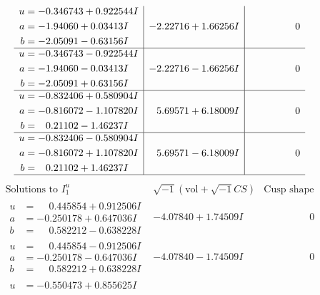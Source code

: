\documentclass[1p]{elsarticle_modified}
\theoremstyle{definition}
\newcommand{\I}{\sqrt{-1}}
\begin{document}
$$\begin{array}{c|c|c}
\begin{aligned}
u &= -0.346743 + 0.922544 I \\
a &= -1.94060 + 0.03413 I \\
b &= -2.05091 - 0.63156 I\end{aligned}
 & -2.22716 + 1.66256 I & \phantom{-0.000000 } 0 \\ \hline\begin{aligned}
u &= -0.346743 - 0.922544 I \\
a &= -1.94060 - 0.03413 I \\
b &= -2.05091 + 0.63156 I\end{aligned}
 & -2.22716 - 1.66256 I & \phantom{-0.000000 } 0 \\ \hline\begin{aligned}
u &= -0.832406 + 0.580904 I \\
a &= -0.816072 - 1.107820 I \\
b &= \phantom{-}0.21102 - 1.46237 I\end{aligned}
 & \phantom{-}5.69571 + 6.18009 I & \phantom{-0.000000 } 0 \\ \hline\begin{aligned}
u &= -0.832406 - 0.580904 I \\
a &= -0.816072 + 1.107820 I \\
b &= \phantom{-}0.21102 + 1.46237 I\end{aligned}
 & \phantom{-}5.69571 - 6.18009 I & \phantom{-0.000000 } 0\\
 \hline 
 \end{array}$$\newpage$$\begin{array}{c|c|c}  
\text{Solutions to }I^u_{1}& \I (\text{vol} + \sqrt{-1}CS) & \text{Cusp shape}\\
 \hline 
\begin{aligned}
u &= \phantom{-}0.445854 + 0.912506 I \\
a &= -0.250178 + 0.647036 I \\
b &= \phantom{-}0.582212 - 0.638228 I\end{aligned}
 & -4.07840 + 1.74509 I & \phantom{-0.000000 } 0 \\ \hline\begin{aligned}
u &= \phantom{-}0.445854 - 0.912506 I \\
a &= -0.250178 - 0.647036 I \\
b &= \phantom{-}0.582212 + 0.638228 I\end{aligned}
 & -4.07840 - 1.74509 I & \phantom{-0.000000 } 0 \\ \hline\begin{aligned}
u &= -0.550473 + 0.855625 I \\

\end{aligned}
\end{array}$$
\end{document}
